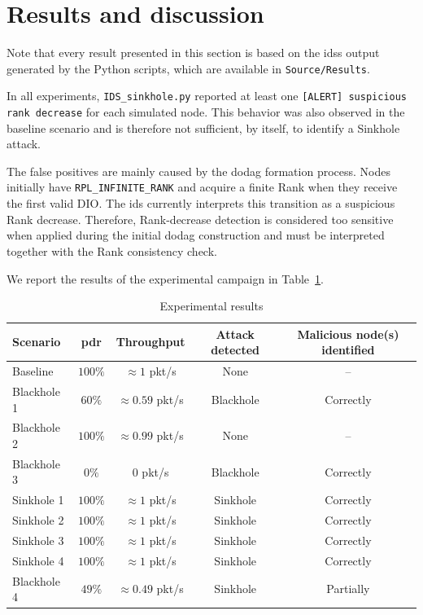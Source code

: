 \section{Results and discussion}
\label{sec:results}
Note that every result presented in this section is based on the \glspl{ids} output generated by the Python scripts, which are available in \texttt{Source/Results}.

In all experiments, \texttt{IDS\_sinkhole.py} reported at least one \texttt{[ALERT] suspicious rank decrease} for each simulated node.
This behavior was also observed in the baseline scenario and is therefore not sufficient, by itself, to identify a Sinkhole attack.

The false positives are mainly caused by the \gls{dodag} formation process.
Nodes initially have \texttt{RPL\_INFINITE\_RANK} and acquire a finite Rank when they receive the first valid DIO.
The \gls{ids} currently interprets this transition as a suspicious Rank decrease.
Therefore, Rank-decrease detection is considered too sensitive when applied during the initial \gls{dodag} construction and must be interpreted together with the Rank consistency check.

We report the results of the experimental campaign in Table~\ref{tab:experimental_results}.

\begin{table}[h]
    \centering
    \caption{Experimental results}
    \label{tab:experimental_results}
    \begin{tabular}{lcccc}
        \hline
        \textbf{Scenario} &
        \textbf{\gls{pdr}} &
        \textbf{Throughput} &
        \textbf{Attack detected} &
        \textbf{Malicious node(s) identified} \\
        \hline
        Baseline & $100\%$ & $\approx 1$ pkt/s & None & -- \\
        Blackhole 1 & $60\%$ & $\approx 0.59$ pkt/s & Blackhole & Correctly \\
        Blackhole 2 & $100\%$ & $\approx 0.99$ pkt/s & None & -- \\
        Blackhole 3 & $0\%$ & $0$ pkt/s & Blackhole & Correctly \\
        Sinkhole 1 & $100\%$ & $\approx 1$ pkt/s & Sinkhole & Correctly \\
        Sinkhole 2 & $100\%$ & $\approx 1$ pkt/s & Sinkhole & Correctly \\
        Sinkhole 3 & $100\%$ & $\approx 1$ pkt/s & Sinkhole & Correctly \\
        Sinkhole 4 & $100\%$ & $\approx 1$ pkt/s & Sinkhole & Correctly \\
        Blackhole 4 & $49\%$ & $\approx 0.49$ pkt/s & Sinkhole & Partially \\
        \hline
    \end{tabular}
\end{table}

